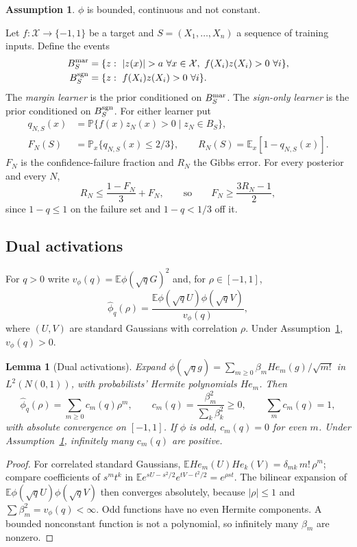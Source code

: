 \documentclass[11pt]{article}
\newtheorem{lemma}[theorem]{Lemma}
\theoremstyle{definition}\newtheorem{assumption}[theorem]{Assumption}
\theoremstyle{remark}\newtheorem{remark}[theorem]{Remark}
\newcommand{\E}{\mathbb E}
\newcommand{\Pp}{\mathbb P}
\newcommand{\X}{\mathcal X}
\begin{document}
\begin{assumption}\label{ass:act}
$\phi$ is bounded, continuous and not constant.
\end{assumption}

Let $f:\X\to\{-1,1\}$ be a target and $S=(X_1,\ldots,X_n)$ a sequence of
training inputs. Define the events
\begin{align*}
 B^{\rm mar}_S&=\{z:\ |z(x)|>a\ \forall x\in\X,\ f(X_i)z(X_i)>0\ \forall i\},\\
 B^{\rm sgn}_S&=\{z:\ f(X_i)z(X_i)>0\ \forall i\}.
\end{align*}
The \emph{margin learner} is the prior conditioned on $B^{\rm mar}_S$.
The \emph{sign-only learner} is the prior conditioned on $B^{\rm sgn}_S$. For either learner put
\begin{align*}
 q_{N,S}(x)&=\Pp\{f(x)z_N(x)>0\mid z_N\in B_S\},\\
 F_N(S)&=\Pp_x\{q_{N,S}(x)\le2/3\},\qquad
 R_N(S)=\E_x[1-q_{N,S}(x)].
\end{align*}
$F_N$ is the confidence-failure fraction and $R_N$ the Gibbs error. For
every posterior and every $N$,
\begin{equation}\label{eq:mixture}
 R_N\le\frac{1-F_N}3+F_N,\qquad\text{so}\qquad F_N\ge\frac{3R_N-1}2,
\end{equation}
since $1-q\le1$ on the failure set and $1-q<1/3$ off it.

\subsection{Dual activations}
For $q>0$ write $v_\phi(q)=\E\phi(\sqrt qG)^2$ and, for $\rho\in[-1,1]$,
\[
 \widehat\phi_q(\rho)=\frac{\E\phi(\sqrt qU)\phi(\sqrt qV)}{v_\phi(q)},
\]
where $(U,V)$ are standard Gaussians with correlation $\rho$.
Under Assumption~\ref{ass:act}, $v_\phi(q)>0$.

\begin{lemma}[Dual activations]\label{lem:dual}
Expand $\phi(\sqrt q g)=\sum_{m\ge0}\beta_m He_m(g)/\sqrt{m!}$ in
$L^2(N(0,1))$, with probabilists' Hermite polynomials $He_m$. Then
\[
 \widehat\phi_q(\rho)=\sum_{m\ge0}c_m(q)\rho^m,\qquad
 c_m(q)=\frac{\beta_m^2}{\sum_k\beta_k^2}\ge0,\qquad \sum_mc_m(q)=1,
\]
with absolute convergence on $[-1,1]$. If $\phi$ is odd, $c_m(q)=0$ for
even $m$. Under Assumption~\ref{ass:act}, infinitely many $c_m(q)$ are
positive.
\end{lemma}
\begin{proof}
For correlated standard Gaussians,
$\E He_m(U)He_k(V)=\delta_{mk}\,m!\,\rho^m$; compare coefficients of
$s^mt^k$ in $\E e^{sU-s^2/2}e^{tV-t^2/2}=e^{\rho st}$. The bilinear
expansion of $\E\phi(\sqrt qU)\phi(\sqrt qV)$ then converges absolutely,
because $|\rho|\le1$ and $\sum\beta_m^2=v_\phi(q)<\infty$. Odd functions
have no even Hermite components. A bounded nonconstant function is not a
polynomial, so infinitely many $\beta_m$ are nonzero.
\end{proof}
\end{document}
